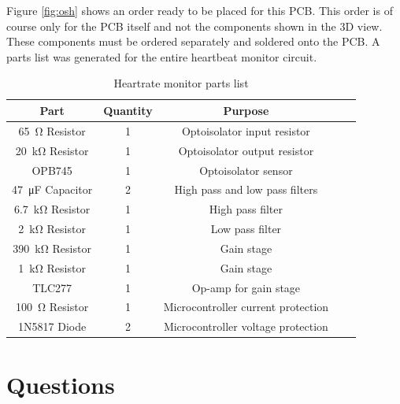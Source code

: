 \documentclass[CMPE]{../KGCOEReport}
\begin{document}
	Figure \ref{fig:osh} shows an order ready to be placed for this PCB. This order
	is of course only for the PCB itself and not the components shown in the 3D view.
	These components must be ordered separately and soldered onto the PCB. A parts
	list was generated for the entire heartbeat monitor circuit.

\begin{table}[H]
    \renewcommand{\arraystretch}{1.2}
    \setlength{\tabcolsep}{12pt}
    \caption{Heartrate monitor parts list}
        \begin{center}
            \begin{tabular}{|c|c|c||c|c|}
                \hline
				Part & Quantity & Purpose\\\hline

\SI{65}{\ohm} Resistor			& 1	& Optoisolator input resistor\\\hline
\SI{20}{\kilo\ohm} Resistor		& 1	& Optoisolator output resistor\\\hline
OPB745							& 1	& Optoisolator sensor\\\hline
\SI{47}{\micro\farad} Capacitor	& 2	& High pass and low pass filters\\\hline
\SI{6.7}{\kilo\ohm} Resistor	& 1	& High pass filter\\\hline
\SI{2}{\kilo\ohm} Resistor		& 1	& Low pass filter\\\hline
\SI{390}{\kilo\ohm} Resistor	& 1	& Gain stage\\\hline
\SI{1}{\kilo\ohm} Resistor		& 1	& Gain stage\\\hline
TLC277							& 1	& Op-amp for gain stage\\\hline
\SI{100}{\ohm} Resistor			& 1	& Microcontroller current protection\\\hline
1N5817 Diode					& 2	& Microcontroller voltage protection\\\hline
            \end{tabular}
        \end{center}
        \label{tab:p1}
    \end{table}

	\section*{Questions}
\end{document}
